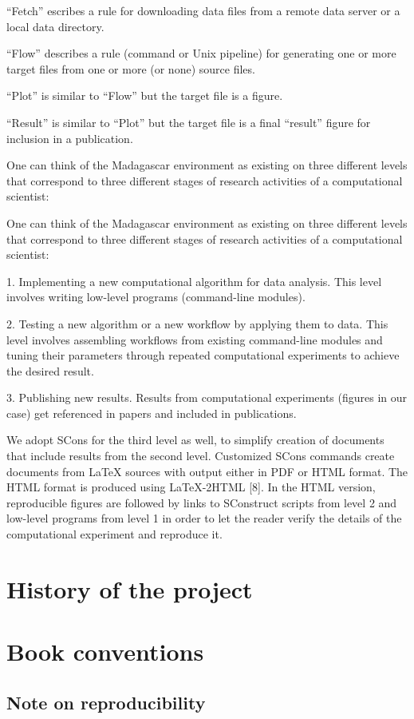 ``Fetch'' escribes a rule for downloading data
files from a remote data server or a local data directory. 
 
``Flow'' describes a rule (command or Unix pipeline) for
generating one or more target files from one or more (or none) source
files.
 
``Plot'' is similar to ``Flow'' but the target file is a figure.  

``Result'' is similar to ``Plot'' but the
target file is a final ``result'' figure for inclusion
in a publication.  

One can think of the Madagascar environment as existing on three
different levels that correspond to three different stages of research
activities of a computational scientist:

One can think of the Madagascar environment as existing on three
different levels that correspond to three different stages of research
activities of a computational scientist:

1. Implementing a new computational algorithm for data analysis. This
level involves writing low-level programs (command-line modules).

2. Testing a new algorithm or a new workflow by applying them to
data. This level involves assembling workflows from existing
command-line modules and tuning their parameters through repeated
computational experiments to achieve the desired result.

3. Publishing new results. Results from computational experiments
(figures in our case) get referenced in papers and included in
publications.

We adopt SCons for the third level as well, to simplify creation of
documents that include results from the second level. Customized SCons
commands create documents from LaTeX sources with output either in PDF
or HTML format. The HTML format is produced using LaTeX-2HTML [8]. In
the HTML version, reproducible figures are followed by links to
SConstruct scripts from level 2 and low-level programs from level 1 in
order to let the reader verify the details of the computational
experiment and reproduce it.


\section{History of the project}

\section{Book conventions}

\subsection{Note on reproducibility}





